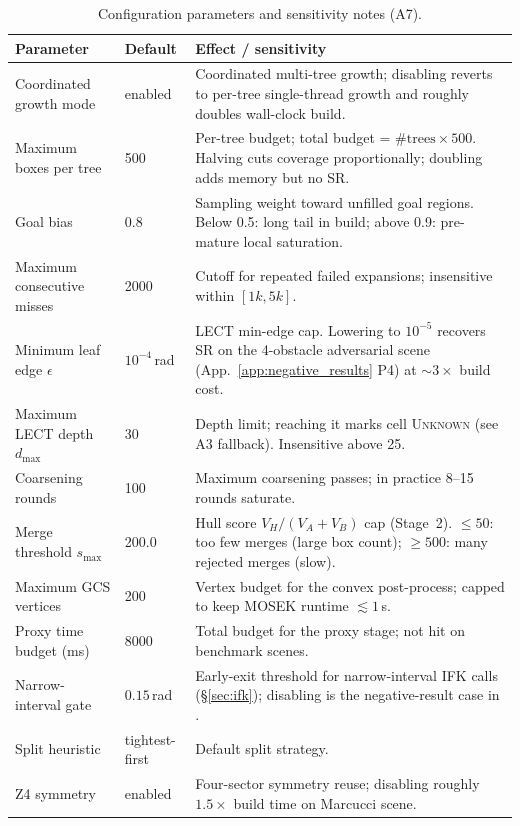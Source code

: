 \documentclass[journal]{IEEEtran}
\begin{document}
\begin{table}[ht]
\centering
\small
\begin{tabularx}{\columnwidth}{@{}T l X@{}}
\toprule
\textbf{Parameter} & \textbf{Default} & \textbf{Effect / sensitivity} \\
\midrule
Coordinated growth mode & enabled & Coordinated multi-tree growth; disabling reverts to per-tree single-thread growth and roughly doubles wall-clock build. \\
Maximum boxes per tree & 500 & Per-tree budget; total budget = $\#\text{trees}\times 500$. Halving cuts coverage proportionally; doubling adds memory but no SR. \\
Goal bias & 0.8 & Sampling weight toward unfilled goal regions. Below 0.5: long tail in build; above 0.9: pre-mature local saturation. \\
Maximum consecutive misses & 2000 & Cutoff for repeated failed expansions; insensitive within $[1k,5k]$. \\
Minimum leaf edge $\epsilon$ & $10^{-4}$\,rad & LECT min-edge cap. Lowering to $10^{-5}$ recovers SR on the 4-obstacle adversarial scene (App.~\ref{app:negative_results} P4) at $\sim 3\times$ build cost. \\
Maximum LECT depth $d_{\max}$ & 30 & Depth limit; reaching it marks cell \textsc{Unknown} (see A3 fallback). Insensitive above 25. \\
Coarsening rounds & 100 & Maximum coarsening passes; in practice 8--15 rounds saturate. \\
Merge threshold $s_{\max}$ & 200.0 & Hull score $V_H/(V_A{+}V_B)$ cap (Stage~2). $\le\!50$: too few merges (large box count); $\ge\!500$: many rejected merges (slow). \\
Maximum GCS vertices & 200 & Vertex budget for the convex post-process; capped to keep MOSEK runtime $\lesssim 1$\,s. \\
Proxy time budget (ms) & 8000 & Total budget for the proxy stage; not hit on benchmark scenes. \\
Narrow-interval gate & $0.15$\,rad & Early-exit threshold for narrow-interval IFK calls (\S\ref{sec:ifk}); disabling is the negative-result case in . \\
Split heuristic & tightest-first & Default split strategy. \\
Z4 symmetry & enabled & Four-sector symmetry reuse; disabling roughly $1.5{\times}$ build time on Marcucci scene. \\
\bottomrule
\end{tabularx}
\caption{Configuration parameters and sensitivity notes (A7).}
\label{tab:config_params}
\end{table}
\end{document}
